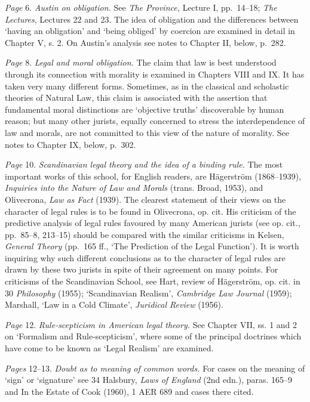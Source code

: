 \emph{Page} 6. \emph{Austin on obligation.} See \emph{The Province,}
Lecture I, pp.~14--18; \emph{The Lectures}, Lectures 22 and 23. The idea
of obligation and the differences between `having an obligation' and
`being obliged' by coercion are examined in detail in Chapter V, s. 2.
On Austin's analysis see notes to Chapter II, below, p.~282.

\emph{Page} 8. \emph{Legal and moral obligation.} The claim that law is
best understood through its connection with morality is examined in
Chapters VIII and IX. It has taken very many different forms. Sometimes,
as in the classical and scholastic theories of Natural Law, this claim
is associated with the assertion that fundamental moral distinctions are
`objective truths' discoverable by human reason; but many other jurists,
equally concerned to stress the interdependence of law and morals, are
not committed to this view of the nature of morality. See notes to
Chapter IX, below, p.~302.

\emph{Page} 10. \emph{Scandinavian legal theory and the idea of a
binding rule.} The most important works of this school, for English
readers, are Hägerström (1868--1939), \emph{Inquiries into the Nature of
Law and Morals} (trans. Broad, 1953), and Olivecrona, \emph{Law as Fact}
(1939). The clearest statement of their views on the character of legal
rules is to be found in Olivecrona, op. cit. His criticism of the
predictive analysis of legal rules favoured by many American jurists
(see op. cit., pp.~85--8, 213--15) should be compared with the similar
criticisms in Kelsen, \emph{General Theory} (pp.~165 ff., `The
Prediction of the Legal Function'). It is worth inquiring why such
different conclusions as to the character of legal rules are drawn by
these two jurists in spite of their agreement on many points. For
criticisms of the Scandinavian School, see Hart, review of Hägerström,
op. cit. in 30 \emph{Philosophy} (1955); `Scandinavian Realism',
\emph{Cambridge Law Journal} (1959); Marshall, `Law in a Cold Climate',
\emph{Juridical Review} (1956).

\emph{Page} 12. \emph{Rule-scepticism in American legal theory.} See
Chapter VII, ss. 1 and 2 on `Formalism and Rule-scepticism', where some
of the principal doctrines which have come to be known as `Legal
Realism' are examined.

\emph{Pages} 12--13. \emph{Doubt as to meaning of common words.} For
cases on the meaning of `sign' or `signature' see 34 Halsbury,
\emph{Laws of England} (2nd edn.), paras. 165--9 and In the Estate of
Cook (1960), 1 AER 689 and cases there cited.

